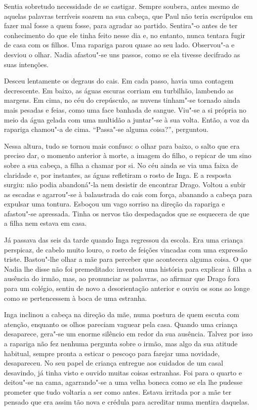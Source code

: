 Sentia sobretudo necessidade de se castigar. Sempre soubera, antes mesmo
de aquelas palavras terríveis soarem na sua cabeça, que Paul não teria
escrúpulos em fazer mal fosse a quem fosse, para agradar ao partido.
Sentira"-o antes de ter conhecimento do que ele tinha feito nesse dia e,
no entanto, nunca tentara fugir de casa com os filhos. Uma rapariga
parou quase ao seu lado. Observou"-a e desviou o olhar. Nadia afastou"-se
uns passos, como se ela tivesse decifrado as suas intenções.

Desceu lentamente os degraus do cais. Em cada passo, havia uma contagem
decrescente. Em baixo, as águas escuras corriam em turbilhão, lambendo
as margens. Em cima, no céu do crepúsculo, as nuvens tinham"-se tornado
ainda mais pesadas e feias, como uma face banhada de sangue. Viu"-se a si
própria no meio da água gelada com uma multidão a juntar"-se à sua
volta. Então, a voz da rapariga chamou"-a de cima. ``Passa"-se alguma
coisa?'', perguntou.

Nessa altura, tudo se tornou mais confuso: o olhar
para baixo, o salto que era preciso dar, o momento anterior à
morte, a imagem do filho, o repicar de um sino sobre a sua cabeça, a
filha a chamar por si. No céu ainda se via uma faixa de claridade e, por
instantes, as águas refletiram o rosto de Inga. E a resposta surgiu:
não podia abandoná"-la nem desistir de encontrar Drago. Voltou a subir as
escadas e agarrou"-se à balaustrada do cais com força, abanando a cabeça
para expulsar uma tontura. Esboçou um vago sorriso na direção da
rapariga e afastou"-se apressada. Tinha os nervos tão despedaçados que se
esquecera de que a filha nem estava em casa.

Já passava das seis da tarde quando Inga regressou da escola. Era uma
criança perspicaz, de cabelo muito louro, o rosto de feições vincadas
com uma expressão triste. Bastou"-lhe olhar a mãe para perceber que
acontecera alguma coisa. O que Nadia lhe disse não foi premeditado:
inventou uma história para explicar à filha a ausência do irmão, mas, ao
pronunciar as palavras, ao afirmar que Drago fora para um colégio,
sentiu de novo a desorientação anterior e ouviu os sons ao longe como
se pertencessem à boca de uma estranha.

Inga inclinou a cabeça na direção da mãe, numa postura de quem escuta
com atenção, enquanto os olhos pareciam vaguear pela casa. Quando uma
criança desaparece, gera"-se um enorme silêncio em redor da sua
ausência. Talvez por isso a rapariga não fez nenhuma pergunta sobre o
irmão, mas algo da sua atitude habitual, sempre pronta a esticar o
pescoço para farejar uma novidade, desapareceu. No seu papel de
criança entregue aos cuidados de um casal desavindo, já tinha visto e
ouvido muitas coisas estranhas. Foi para o quarto e deitou"-se na cama,
agarrando"-se a uma velha boneca como se ela lhe pudesse prometer que tudo
voltaria a ser como antes. Estava irritada por a mãe ter pensado que
era assim tão nova e crédula para acreditar numa mentira daquelas.

